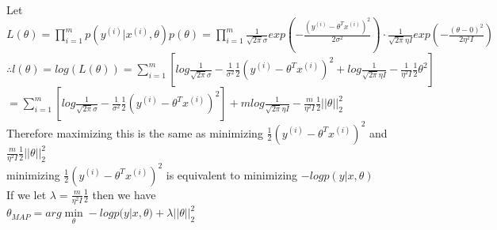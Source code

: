 \begin{answer}\\
Let $L(\theta)=\prod_{i=1}^{m}p(y^{(i)}|x^{(i)},\theta)p(\theta)=\prod_{i=1}^{m}\frac{1}{\sqrt{2 \pi}\sigma}exp(-\frac{(y^{(i)}-\theta^T x^{(i)})^2}{2 \sigma^2}) \cdot \frac{1}{\sqrt{2 \pi}\eta I} exp(- \frac{(\theta-0)^2}{2 \eta^2 I})$\\
$\therefore l(\theta)=log(L(\theta))=\sum_{i=1}^{m}\left [ log \frac{1}{\sqrt{2 \pi} \sigma}-\frac{1}{\sigma^2}\frac{1}{2}(y^{(i)}-\theta^T x^{(i)})^2 + log \frac{1}{\sqrt{2 \pi}\eta I} -\frac{1}{\eta^2 I}\frac{1}{2} \theta^2 \right ]$\\
$=\sum_{i=1}^{m}\left [ log \frac{1}{\sqrt{2 \pi} \sigma}-\frac{1}{\sigma^2}\frac{1}{2}(y^{(i)}-\theta^T x^{(i)})^2 \right ] + m log \frac{1}{\sqrt{2 \pi}\eta I} -\frac{m}{\eta^2 I}\frac{1}{2} ||\theta||_2^2$\\
Therefore maximizing this is the same as minimizing $\frac{1}{2}(y^{(i)}-\theta^T x^{(i)})^2$ and $\frac{m}{\eta^2 I}\frac{1}{2} ||\theta||_2^2$\\
minimizing $\frac{1}{2}(y^{(i)}-\theta^T x^{(i)})^2$ is equivalent to minimizing $-log p(y|x,\theta)$\\
If we let $\lambda=\frac{m}{\eta^2 I}\frac{1}{2}$ then we have\\
$\theta_{MAP}=arg \min\limits_{\theta} -log p(y|x,\theta)+\lambda ||\theta||_2^2$\\
\end{answer}
